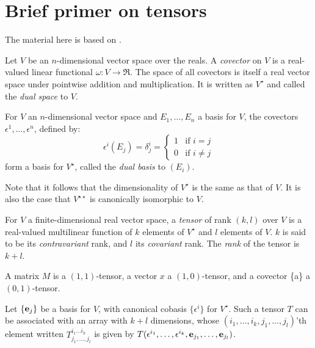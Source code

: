 \section{Brief primer on tensors}\label{sec:tensor}
The material here is based on \cite{lee-book-2000,dullemond-1991-tensor}.


Let \(V\) be an \(n\)-dimensional vector space over the reals. A {\em covector} on \(V\) is a real-valued linear functional \(\omega:V\rightarrow \Re\). The space of all covectors is itself a real vector space  under pointwise addition and multiplication. It is written as \(V^{\star}\) and called the {\em dual space} to \(V\). 

\begin{proposition} For \(V\) an \(n\)-dimensional vector space and \(E_1, \ldots, E_n\) a basis for \(V\), the covectors \(\epsilon^1, \ldots, \epsilon^n\), defined by:
  \[
  \epsilon^i(E_j) = \delta^i_j = \left\{
  \begin{array}{ll}
    1 & \mbox{if \(i =j\)} \\
    0 & \mbox{if \(i\not=j\)}
    \end{array}\right.
    \]
\noindent form a basis for \(V^{\star}\), called the {\em dual basis} to \((E_i)\).   
\end{proposition}
Note that it follows that the dimensionality of \(V^{\star}\) is the same as that of \(V\). It is also the case that \(V^{\star\star}\) is canonically isomorphic to \(V\). 


\begin{definition}[Tensor] For $V$ a finite-dimensional real vector space, a {\em tensor} of rank \((k,l)\) over $V$ is a real-valued multilinear function of $k$ elements of \(V^{\star}\) and \(l\) elements of \(V\). \(k\) is said to be its {\em contravariant} rank, and \(l\) its {\em covariant} rank. The {\em rank} of the tensor is \(k+l\).
\end{definition}
A matrix \(M\) is a \((1,1)\)-tensor, a vector \(x\) a \((1,0)\)-tensor, and a covector \{a\} a \((0,1)\)-tensor.

Let \(\{{\bf e}_j\}\) be a basis for \(V\), with canonical cobasis \(\{\epsilon^i\}\) for \(V^{\star}\). 
Such a tensor \(T\) can be associated with an array with \(k+l\) dimensions, whose \((i_1, \ldots, i_k, j_1, \ldots, j_l)\)'th element written \(T^{i_1\ldots i_k}_{j_1, \ldots, j_l}\) is given by \(T(\epsilon^{i_1}, \ldots, \epsilon^{i_k}, {\bf e}_{j_1}, \ldots, {\bf e}_{j_l})\).

